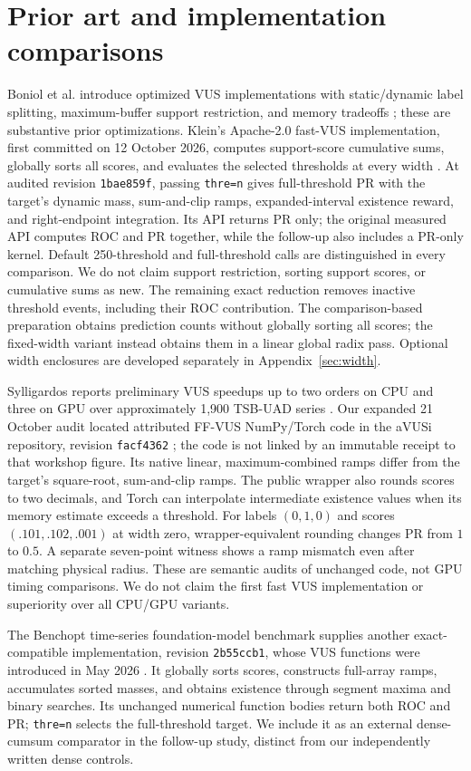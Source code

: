 \documentclass[10pt]{article}
\begin{document}
\section{Prior art and implementation comparisons}
Boniol et al. introduce optimized VUS implementations with static/dynamic
label splitting, maximum-buffer support restriction, and memory tradeoffs
\cite{boniol2025}; these are substantive prior optimizations.
Klein's Apache-2.0 fast-VUS implementation, first committed on 12 October
2026, computes support-score cumulative sums, globally sorts all scores, and
evaluates the selected thresholds at every width \cite{klein2026}.
At audited revision \texttt{1bae859f}, passing \texttt{thre=n} gives full-threshold
PR with the target's dynamic mass, sum-and-clip ramps, expanded-interval
existence reward, and right-endpoint integration. Its API returns PR only;
the original measured API computes ROC and PR together, while the follow-up
also includes a PR-only kernel. Default 250-threshold and
full-threshold calls are distinguished in every comparison.
We do not claim support restriction, sorting support scores, or cumulative
sums as new. The remaining exact reduction removes inactive threshold events,
including their ROC contribution. The comparison-based preparation obtains
prediction counts without globally sorting all scores; the fixed-width
variant instead obtains them in a linear global radix pass.
Optional width enclosures are developed separately in
Appendix~\ref{sec:width}.

Sylligardos reports preliminary VUS speedups up to two
orders on CPU and three on GPU over approximately 1,900 TSB-UAD series
\cite{sylligardos2025}. Our expanded 21 October audit located attributed
FF-VUS NumPy/Torch code in the aVUSi repository, revision
\texttt{facf4362} \cite{ffvus2026}; the code is not linked by an immutable
receipt to that workshop figure. Its native linear, maximum-combined ramps
differ from the target's square-root, sum-and-clip ramps. The public wrapper
also rounds scores to two decimals, and Torch can interpolate intermediate
existence values when its memory estimate exceeds a threshold. For labels
$(0,1,0)$ and scores $(.101,.102,.001)$ at width zero, wrapper-equivalent
rounding changes PR from $1$ to $0.5$. A separate seven-point witness shows
a ramp mismatch even after matching physical radius. These are semantic
audits of unchanged code, not GPU timing comparisons. We do not claim the
first fast VUS implementation or superiority over all CPU/GPU variants.

The Benchopt time-series foundation-model benchmark supplies another
exact-compatible implementation, revision \texttt{2b55ccb1}, whose VUS
functions were introduced in May 2026 \cite{benchopt2026}. It globally sorts
scores, constructs full-array ramps, accumulates sorted masses, and obtains
existence through segment maxima and binary searches. Its unchanged
numerical function bodies return both ROC and PR; \texttt{thre=n} selects
the full-threshold target. We include it as an external dense-cumsum
comparator in the follow-up study, distinct from our independently written
dense controls.
\end{document}

